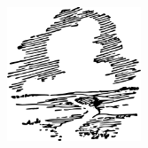 \begin{center}
\includegraphics[width=0.3\textwidth]{figures/ch-03/fig-ch-03-tail.pdf}
\end{center}


















